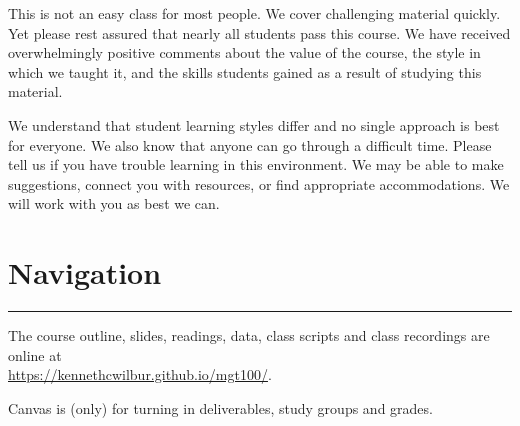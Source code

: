 \documentclass[12pt]{article}
\begin{document}
This is not an easy class for most people. We cover challenging material quickly. Yet please rest assured that nearly all students pass this course. We have received overwhelmingly positive comments about the value of the course, the style in which we taught it, and the skills students gained as a result of studying this material.

We understand that student learning styles differ and no single approach is best for everyone. We also know that anyone can go through a difficult time. Please tell us if you have trouble learning in this environment. We may be able to make suggestions, connect you with resources, or find appropriate accommodations. We will work with you as best we can.

\vspace{0.2cm}


\section*{Navigation}
\medskip
\hrule
\medskip







The course outline, slides, readings, data, class scripts and class recordings are online at \\ \textcolor{blue}{\href{https://kennethcwilbur.github.io/mgt100/}{https://kennethcwilbur.github.io/mgt100/}}. 


Canvas is (only) for turning in deliverables, study groups and grades. 
\end{document}
